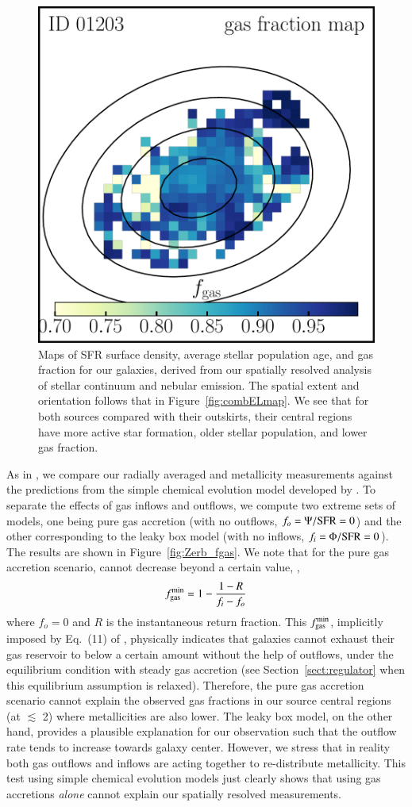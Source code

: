 \begin{figure}
    \includegraphics[width=.33\textwidth]{fig/physmap_fgas_ID01203.pdf}
    \caption[Maps of SFR surface density, average stellar population age, and gas fraction for our galaxies,
    derived from our spatially resolved analysis of stellar continuum and nebular emission.]
    {Maps of SFR surface density, average stellar population age, and gas fraction for our galaxies, derived from our
    spatially resolved analysis of stellar continuum and nebular emission.
    The spatial extent and orientation follows that in Figure~\ref{fig:combELmap}.
    We see that for both sources compared with their outskirts, their central regions have more active star formation, older 
    stellar population, and lower gas fraction.
    \label{fig:physmap}}
\end{figure}

As in \citet{Cresci:2010hr}, we compare our radially averaged \fgas and metallicity measurements against the predictions from
the simple chemical evolution model developed by \citet{Erb:2008di}.
To separate the effects of gas inflows and outflows, we compute two extreme sets of models, one being pure gas 
accretion (\ie with no outflows, $f_o=\Psi/{\rm SFR}=0$) and the other corresponding to the leaky box model (\ie with 
no inflows, $f_i=\Phi/{\rm SFR}=0$).
The results are shown in Figure~\ref{fig:Zerb_fgas}.
We note that for the pure gas accretion scenario, \fgas cannot decrease beyond a certain value, \ie,
$$
    f_{\rm gas}^{\rm min} = 1-\frac{1-R}{f_i - f_o}
$$
where $f_o=0$ and $R$ is the instantaneous return fraction. This $f_{\rm gas}^{\rm min}$, implicitly imposed by Eq.~(11) of 
\citet{Erb:2008di}, physically indicates that galaxies cannot exhaust their gas reservoir to below a certain amount without the 
help of outflows,
under the equilibrium condition with steady gas accretion (see Section~\ref{sect:regulator} when this equilibrium assumption is 
relaxed).
Therefore, the pure gas accretion scenario cannot explain the observed gas fractions in our source central regions (at $\lesssim$ 
2\kpc) where metallicities are also lower.
The leaky box model, on the other hand, provides a plausible explanation for our observation such that the outflow rate tends to 
increase towards galaxy center.
However, we stress that in reality both gas outflows and inflows are acting together to re-distribute 
metallicity. This test using simple chemical evolution models just clearly shows that using gas accretions 
\emph{alone} cannot explain our spatially resolved measurements.

